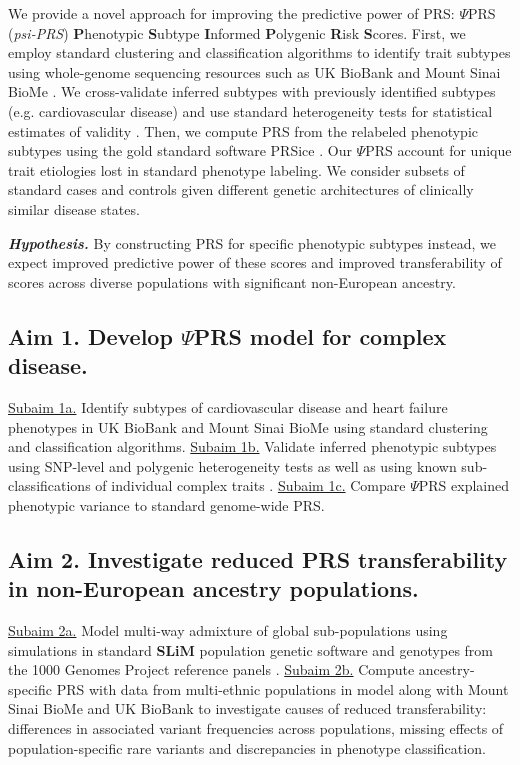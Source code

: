 \documentclass[11pt]{article}  %
\newcommand{\inden}[1]{\mbox{} \hspace{#1} } %
\begin{document}
\hspace{10mm}We provide a novel approach for improving the predictive power of PRS: $\Psi$PRS (\textit{psi-PRS}) \textbf{P}henotypic \textbf{S}ubtype \textbf{I}nformed \textbf{P}olygenic \textbf{R}isk \textbf{S}cores. First, we employ standard clustering and classification algorithms to identify trait subtypes using whole-genome sequencing resources such as UK BioBank and Mount Sinai BioMe \cite{bycroft_uk_2018}. We cross-validate inferred subtypes with previously identified subtypes (e.g. cardiovascular disease) and use standard heterogeneity tests for statistical estimates of validity \cite{dahl_robust_2020}. Then, we compute PRS from the relabeled phenotypic subtypes using the gold standard software PRSice \cite{choi_prsice-2_2019}. Our $\Psi$PRS account for unique trait etiologies lost in standard phenotype labeling. We consider subsets of standard cases and controls given different genetic architectures of clinically similar disease states. 

\textbf{\textit{Hypothesis.}} By constructing PRS for specific phenotypic subtypes instead, we expect improved predictive power of these scores and improved transferability of scores across diverse populations with significant non-European ancestry.

\subsection*{Aim 1. Develop $\Psi$PRS model for complex disease.}
\underline{Subaim 1a.} Identify subtypes of cardiovascular disease and heart failure phenotypes in UK BioBank and Mount Sinai BioMe using standard clustering and classification algorithms. \underline{Subaim 1b.} Validate inferred phenotypic subtypes using SNP-level \cite{dahl_reverse_2019} and polygenic heterogeneity tests \cite{dahl_robust_2020} as well as using known sub-classifications of individual complex traits \cite{li_identification_2015}. \underline{Subaim 1c.} Compare $\Psi$PRS explained phenotypic variance to standard genome-wide PRS.

\subsection*{Aim 2. Investigate reduced PRS transferability in non-European ancestry populations.}
\underline{Subaim 2a.} Model multi-way admixture of global sub-populations using simulations in standard \textbf{SLiM} population genetic software \cite{haller_slim_2019} and genotypes from the 1000 Genomes Project reference panels \cite{noauthor_global_2015}. \underline{Subaim 2b.} Compute ancestry-specific PRS with data from multi-ethnic populations in model along with Mount Sinai BioMe and UK BioBank to investigate causes of reduced transferability: differences in associated variant frequencies across populations, missing effects of population-specific rare variants and discrepancies in phenotype classification. 
\end{document}
